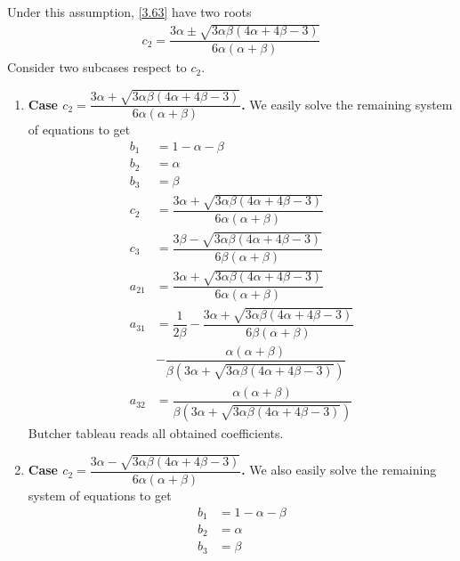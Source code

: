 \documentclass[a4paper,oneside]{book}
\numberwithin{equation}{chapter}
\begin{document}
\begin{enumerate}
Under this assumption, \eqref{3.63} have two roots
\begin{align}
{c_2} = \dfrac{{3\alpha  \pm \sqrt {3\alpha \beta \left( {4\alpha  + 4\beta  - 3} \right)} }}{{6\alpha \left( {\alpha  + \beta } \right)}}
\end{align}
Consider two subcases respect to $c_2$.
\begin{enumerate}
\item \textbf{Case ${c_2} = \dfrac{{3\alpha  + \sqrt {3\alpha \beta \left( {4\alpha  + 4\beta  - 3} \right)} }}{{6\alpha \left( {\alpha  + \beta } \right)}}$.}
We easily solve the remaining system of equations to get
\begin{align}
{b_1} &= 1 - \alpha  - \beta \\
{b_2} &= \alpha \\
{b_3} &= \beta \\
{c_2} &= \dfrac{{3\alpha  + \sqrt {3\alpha \beta \left( {4\alpha  + 4\beta  - 3} \right)} }}{{6\alpha \left( {\alpha  + \beta } \right)}}\\
{c_3} &= \dfrac{{3\beta  - \sqrt {3\alpha \beta \left( {4\alpha  + 4\beta  - 3} \right)} }}{{6\beta \left( {\alpha  + \beta } \right)}}\\
{a_{21}} &= \dfrac{{3\alpha  + \sqrt {3\alpha \beta \left( {4\alpha  + 4\beta  - 3} \right)} }}{{6\alpha \left( {\alpha  + \beta } \right)}}\\
{a_{31}} &= \dfrac{1}{{2\beta }} - \dfrac{{3\alpha  + \sqrt {3\alpha \beta \left( {4\alpha  + 4\beta  - 3} \right)} }}{{6\beta \left( {\alpha  + \beta } \right)}} \\
&- \dfrac{{\alpha \left( {\alpha  + \beta } \right)}}{{\beta \left( {3\alpha  + \sqrt {3\alpha \beta \left( {4\alpha  + 4\beta  - 3} \right)} } \right)}}\\
{a_{32}} &= \dfrac{{\alpha \left( {\alpha  + \beta } \right)}}{{\beta \left( {3\alpha  + \sqrt {3\alpha \beta \left( {4\alpha  + 4\beta  - 3} \right)} } \right)}}
\end{align}
Butcher tableau reads all obtained coefficients.
\item \textbf{Case ${c_2} = \dfrac{{3\alpha  - \sqrt {3\alpha \beta \left( {4\alpha  + 4\beta  - 3} \right)} }}{{6\alpha \left( {\alpha  + \beta } \right)}}$.} 
We also easily solve the remaining system of equations to get
\begin{align}
{b_1} &= 1 - \alpha  - \beta \\
{b_2} &= \alpha \\
{b_3} &= \beta \\

\end{align}
\end{enumerate}
\end{enumerate}
\end{document}
